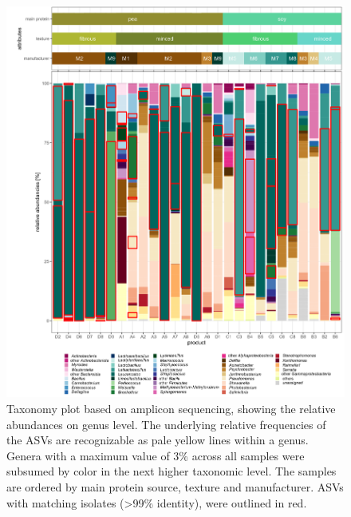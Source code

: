 \documentclass[preprint, 3p,
authoryear]{elsarticle} %
\begin{document}
\begin{figure}

{\centering \includegraphics[width=1\linewidth]{Fig2_3percent} 

}

\caption{\label{fig2} Taxonomy plot based on amplicon sequencing, showing the relative abundances on genus level. The underlying relative frequencies of the ASVs are recognizable as pale yellow lines within a genus. Genera with a maximum value of 3\% across all samples were subsumed by color in the next higher taxonomic level.  The samples are ordered by main protein source, texture and manufacturer. ASVs with matching isolates (>99\% identity), were outlined in red.}\label{fig:fig2}
\end{figure}
\end{document}
